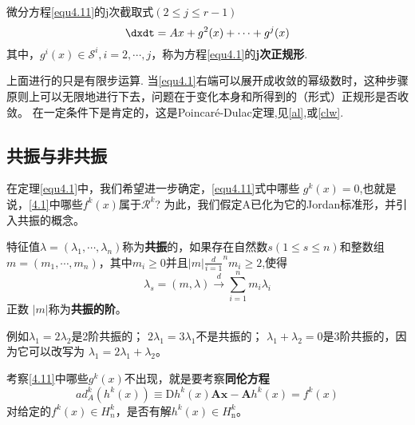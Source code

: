 \begin{defination}
  微分方程\ref{equ4.11}的j次截取式$( 2 \leqslant j \leqslant r - 1 )$
  \begin{equation}
        \label{eq:1.4.13}
\dxdt= A x + g ^ { 2 } ( x ) + \cdots + g ^ { j } ( x )
  \end{equation}
  其中，$g ^ { i } ( x ) \in \mathscr{S} ^ { i } , i = 2 , \cdots , j$，称为方程\ref{equ4.1}的\textbf{j次正规形}.
\end{defination}

\begin{corollary}
    \label{corollary:1.4.3}
  上面进行的只是有限步运算.
  当\ref{equ4.1}右端可以展开成收敛的幂级数时，这种步骤原则上可以无限地进行下去，问题在于变化本身和所得到的（形式）正规形是否收敛。
  在一定条件下是肯定的，这是Poincaré-Dulac定理,见\ref{al},或\ref{clw}.
\end{corollary}
\subsection{共振与非共振}
在定理\ref{equ4.1}中，我们希望进一步确定，\ref{equ4.11}式中哪些
\(g^k(x)=0\),也就是说，\ref{4.1}中哪些\(f^k(x)\)属于\(\mathscr{R}^k\)?
为此，我们假定A已化为它的Jordan标准形，并引入共振的概念。

\begin{defination}
  特征值$\lambda = \left( \lambda _ { 1 } , \cdots , \lambda _ { n } \right)$称为\textbf{共振}的，如果存在自然数$s ( 1 \leqslant s \leqslant n )$和整数组$m = \left( m _ { 1 } , \cdots , m _ { n } \right)$，其中$m _ { i } \geqslant 0$并且$| m |$$\frac { d } { i = 1 } ^ { n } m _ { i } \geq 2$,使得
  \begin{equation}
\lambda_{ s } = ( m , \lambda ) \stackrel { d } { \longrightarrow } \sum _ { i = 1 } ^ { n } m _ { i } \lambda _ { i }
    \label{eq:1.4.14}
  \end{equation}
  正数 \(|m|\)称为\textbf{共振的阶}。
  \label{def1.4.11}
\end{defination}

例如$\lambda _ { 1 } = 2 \lambda _ { 2 }$是2阶共振的；
$2 \lambda _ { 1 } = 3 \lambda _ { 1 }$不是共振的；
$\lambda _ { 1 } + \lambda _ { 2 } =0$是3阶共振的，因为它可以改写为
$\lambda _ { 1 } = 2 \lambda _ { 1 } + \lambda _ { 2 }$。

考察\ref{4.11}中哪些\(g^k(x)\)不出现，就是要考察\textbf{同伦方程}
\begin{equation}
    \label{eq:1.4.15}
  a d _ { A } ^ { k } \left( h ^ { k } ( x ) \right)
  \equiv
  \mathrm { D } h ^ { k } ( x ) \boldsymbol { A } \boldsymbol { x } - \boldsymbol { A } h ^ { k } ( x ) = f ^ { k } ( x )
\end{equation}
对给定的$f ^ { k } ( x ) \in H _ { n } ^ { k }$，是否有解$h ^ { k } ( x ) \in H _ { \mathrm { n } } ^ { k }$。

